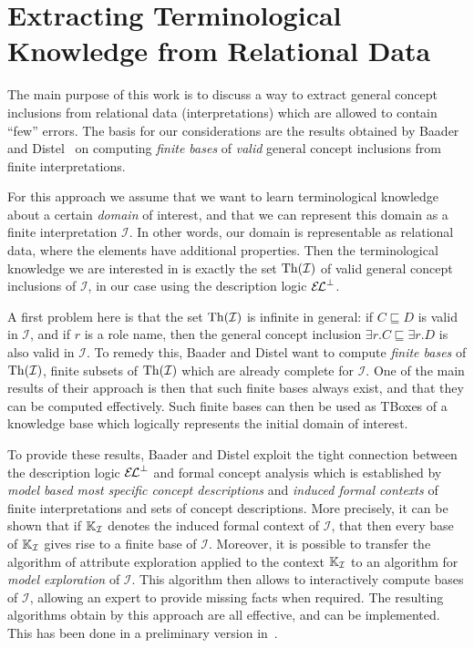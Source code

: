 \section{Extracting Terminological Knowledge from Relational Data}
\label{sec:extr-term-knowl}

The main purpose of this work is to discuss a way to extract general concept inclusions
from relational data (interpretations) which are allowed to contain \enquote{few} errors.
The basis for our considerations are the results obtained by Baader and
Distel~\cite{Diss-Felix,BaDi09,BaaderDistel08} on computing \emph{finite bases} of
\emph{valid} general concept inclusions from finite interpretations.

For this approach we assume that we want to learn terminological knowledge about a certain
\emph{domain} of interest, and that we can represent this domain as a finite
interpretation $\mathcal{I}$.  In other words, our domain is representable as relational
data, where the elements have additional properties.  Then the terminological knowledge we
are interested in is exactly the set $\operatorname{Th}(\mathcal{I})$ of valid general concept
inclusions of $\mathcal{I}$, in our case using the description logic ${{\mathcal{E}\kern-.3ex\mathcal{L}}^\bot}$.

A first problem here is that the set $\operatorname{Th}(\mathcal{I})$ is infinite in general: if $C
\sqsubseteq D$ is valid in $\mathcal{I}$, and if $r$ is a role name, then the general
concept inclusion $\exists r. C \sqsubseteq \exists r. D$ is also valid in $\mathcal{I}$.
To remedy this, Baader and Distel want to compute \emph{finite bases} of
$\operatorname{Th}(\mathcal{I})$, \ie finite subsets of $\operatorname{Th}(\mathcal{I})$ which are already complete
for $\mathcal{I}$.  One of the main results of their approach is then that such finite
bases always exist, and that they can be computed effectively.  Such finite bases can then
be used as TBoxes of a knowledge base which logically represents the initial domain of
interest.

To provide these results, Baader and Distel exploit the tight connection between the
description logic ${{\mathcal{E}\kern-.3ex\mathcal{L}}^\bot}$ and formal concept analysis which is established by \emph{model
  based most specific concept descriptions} and \emph{induced formal contexts} of finite
interpretations and sets of concept descriptions.  More precisely, it can be shown that if
${\mathbb{K}}_{\mathcal{I}}$ denotes the induced formal context of $\mathcal{I}$, that then
every base of ${\mathbb{K}}_{\mathcal{I}}$ gives rise to a finite base of $\mathcal{I}$.
Moreover, it is possible to transfer the algorithm of attribute exploration applied to the
context ${\mathbb{K}}_{\mathcal{I}}$ to an algorithm for \emph{model exploration} of
$\mathcal{I}$.  This algorithm then allows to interactively compute bases of
$\mathcal{I}$, allowing an expert to provide missing facts when required.  The resulting
algorithms obtain by this approach are all effective, and can be implemented.  This has
been done in a preliminary version in~\cite{DBLP:conf/icdm/BorchmannD11}.


